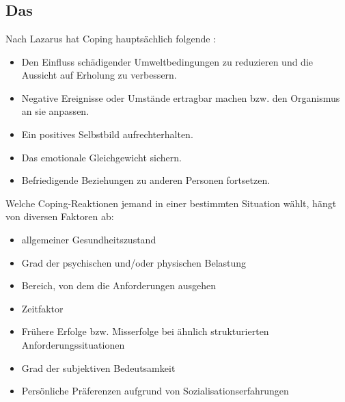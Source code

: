 \section{}

\subsection{Das }

\Text
{{\TxBeschreibung}}%
{%
%
Nach Lazarus hat Coping hauptsächlich folgende
:
\begin{itemize}
  \item Den Einfluss schädigender Umweltbedingungen zu
  reduzieren und die Aussicht auf Erholung zu verbessern.
  \item Negative Ereignisse oder Umstände ertragbar machen
  bzw. den Organismus an sie anpassen.
  \item Ein positives Selbstbild aufrechterhalten.
  \item Das emotionale Gleichgewicht sichern.
  \item Befriedigende Beziehungen zu anderen Personen fortsetzen.
\end{itemize}

Welche Coping-Reaktionen jemand in einer bestimmten
Situation wählt, hängt von diversen Faktoren ab:
\begin{itemize}
  \item allgemeiner Gesundheitszustand
  \item Grad der psychischen und/oder physischen Belastung
  \item Bereich, von dem die Anforderungen ausgehen
  \item Zeitfaktor
  \item Frühere Erfolge bzw. Misserfolge bei ähnlich
  strukturierten Anforderungssituationen
  \item Grad der subjektiven Bedeutsamkeit
  \item Persönliche Präferenzen aufgrund von Sozialisationserfahrungen
\end{itemize}
}%



